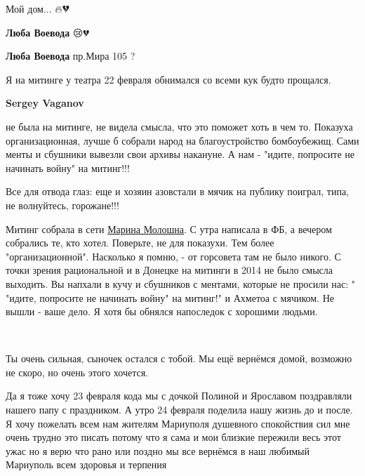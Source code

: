 
Мой дом... 🔥💔

\begin{itemize} %
\textbf{Люба Воевода} 😢💔

\textbf{Люба Воевода} пр.Мира 105 ?
\end{itemize} %


Я на митинге у театра 22 февраля обнимался со всеми кук будто прощался.

\begin{itemize} %
\textbf{Sergey Vaganov} 

не была на митинге, не видела смысла, что это поможет хоть в чем то. Показуха
организационная, лучше б собрали народ на благоустройство бомбоубежищ. Сами
менты и сбушники вывезли свои архивы накануне. А нам - "идите, попросите не
начинать войну" на митинг!!!

Все для отвода глаз: еще и хозяин азовстали в мячик на публику поиграл, типа, не волнуйтесь, горожане!!!


Митинг собрала в сети \href{https://www.facebook.com/maryna.moloshna}{Марина Молошна}. С утра написала в ФБ, а вечером собрались
те, кто хотел. Поверьте, не для показухи. Тем более "организационной".
Насколько я помню, - от горсовета там не было никого. С точки зрения
рациональной и в Донецке на митинги в 2014 не было смысла выходить. Вы напхали
в кучу и сбушников с ментами, которые не просили нас: " "идите, попросите не
начинать войну" на митинг!" и Ахметоа с мячиком. Не вышли - ваше дело. Я хотя
бы обнялся напоследок с хорошими людьми.

\end{itemize} %

🥺


Ты очень сильная, сыночек остался с тобой. Мы ещё вернёмся домой, возможно не
скоро, но очень этого хочется.


Да я тоже хочу 23 февраля кода мы с дочкой Полиной и Ярославом поздравляли
нашего папу с праздником. А утро 24 февраля поделила нашу жизнь до и после. Я
хочу пожелать всем нам жителям Мариуполя душевного спокойствия сил мне очень
трудно это писать потому что я сама и мои близкие пережили весь этот ужас но я
верю что рано или поздно мы все вернёмся в наш любимый Мариуполь всем здоровья
и терпения

